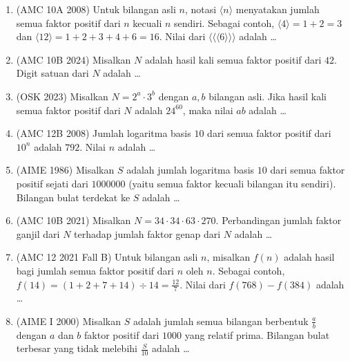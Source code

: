 \documentclass[12pt]{scrartcl}
\begin{document}
\begin{enumerate}[resume]

	\item (AMC 10A 2008)
	Untuk bilangan asli $n$, notasi $\langle n \rangle$ menyatakan jumlah
	semua faktor positif dari $n$ kecuali $n$ sendiri.
	Sebagai contoh, $\langle 4 \rangle = 1 + 2 = 3$ dan
	$\langle 12 \rangle = 1 + 2 + 3 + 4 + 6 = 16$.
	Nilai dari $\langle \langle \langle 6 \rangle \rangle \rangle$ adalah \dots

	\item (AMC 10B 2024)
	Misalkan $N$ adalah hasil kali semua faktor positif dari $42$.
	Digit satuan dari $N$ adalah \dots

	\item (OSK 2023)
	Misalkan $N = 2^{a} \cdot 3^{b}$ dengan $a, b$ bilangan asli.
	Jika hasil kali semua faktor positif dari $N$ adalah $24^{60}$,
	maka nilai $ab$ adalah \dots

	\item (AMC 12B 2008)
	Jumlah logaritma basis $10$ dari semua faktor positif dari $10^{n}$
	adalah $792$. Nilai $n$ adalah \dots

	\item (AIME 1986)
	Misalkan $S$ adalah jumlah logaritma basis $10$ dari semua faktor
	positif sejati dari $1000000$ (yaitu semua faktor kecuali bilangan itu
	sendiri). Bilangan bulat terdekat ke $S$ adalah \dots

	\item (AMC 10B 2021)
	Misalkan $N = 34 \cdot 34 \cdot 63 \cdot 270$.
	Perbandingan jumlah faktor ganjil dari $N$ terhadap jumlah faktor genap
	dari $N$ adalah \dots

	\item (AMC 12 2021 Fall B)
	Untuk bilangan asli $n$, misalkan $f(n)$ adalah hasil bagi jumlah semua
	faktor positif dari $n$ oleh $n$.
	Sebagai contoh, $f(14) = (1 + 2 + 7 + 14) \div 14 = \frac{12}{7}$.
	Nilai dari $f(768) - f(384)$ adalah \dots

	\item (AIME I 2000)
	Misalkan $S$ adalah jumlah semua bilangan berbentuk $\frac{a}{b}$ dengan
	$a$ dan $b$ faktor positif dari $1000$ yang relatif prima.
	Bilangan bulat terbesar yang tidak melebihi $\frac{S}{10}$ adalah \dots


\end{enumerate}
\end{document}

